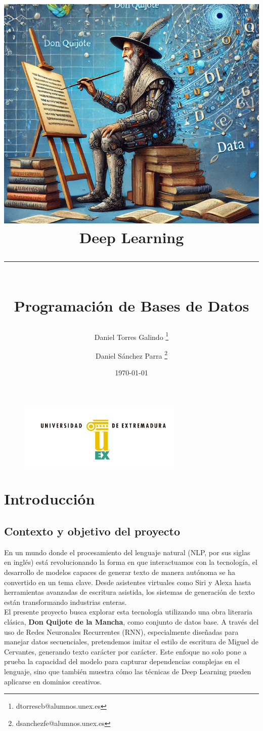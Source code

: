 \documentclass{article}
\title{
\includegraphics[scale=0.5]{don_quijote_generativo.png} \\
\vspace{2em}
\textbf{Deep Learning} \\ \rule{0.8\textwidth}{0.5pt} \\ \large \textbf{Programación de Bases de Datos}}
\author{Daniel Torres Galindo \thanks{dtorrescb@alumnos.unex.es} \and Daniel Sánchez Parra \thanks{dsanchezfe@alumnos.unex.es}}
\date{\today}
\begin{document}
\maketitle

\thispagestyle{empty}

\begin{figure}[H]
    \centering
    \includegraphics[width=0.7\textwidth]{logo-uex.png}
\end{figure}

\renewcommand{\footnoterule}{
    \vspace{1em}
    \hrule width \linewidth height 0.5pt
    \vspace{0.5em}
}

\newpage

\tableofcontents

\newpage

\section{Introducción}
\subsection{Contexto y objetivo del proyecto}
En un mundo donde el procesamiento del lenguaje natural (NLP, por sus siglas en inglés) está revolucionando la forma en que interactuamos con la tecnología, el desarrollo de modelos capaces de generar texto de manera autónoma se ha convertido en un tema clave.
Desde asistentes virtuales como Siri y Alexa hasta herramientas avanzadas de escritura asistida, los sistemas de generación de texto están transformando industrias enteras. \\

El presente proyecto busca explorar esta tecnología utilizando una obra literaria clásica, \textbf{Don Quijote de la Mancha}, como conjunto de datos base.
A través del uso de Redes Neuronales Recurrentes (RNN), especialmente diseñadas para manejar datos secuenciales, pretendemos imitar el estilo de escritura de Miguel de Cervantes, generando texto carácter por carácter.
Este enfoque no solo pone a prueba la capacidad del modelo para capturar dependencias complejas en el lenguaje, sino que también muestra cómo las técnicas de Deep Learning pueden aplicarse en dominios creativos. \\
\end{document}
